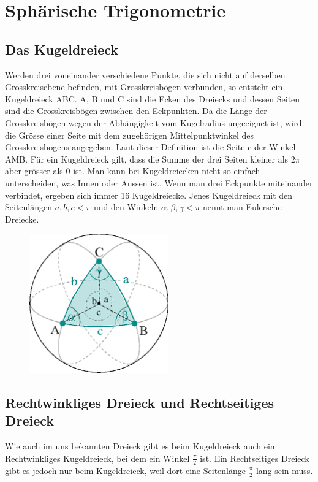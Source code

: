 \documentclass[12pt]{scrartcl}
\begin{document}
	\section{Sphärische Trigonometrie}
	\subsection{Das Kugeldreieck}
	
Werden drei voneinander verschiedene Punkte, die sich nicht auf derselben Grosskreisebene befinden, mit Grosskreisbögen verbunden, so entsteht ein Kugeldreieck ABC.
A, B und C sind die Ecken des Dreiecks und dessen Seiten sind die Grosskreisbögen zwischen den Eckpunkten. 
Da die Länge der Grosskreisbögen wegen der Abhängigkeit vom Kugelradius ungeeignet ist, wird die Grösse einer Seite mit dem zugehörigen Mittelpunktwinkel des Grosskreisbogens angegeben. 
Laut dieser Definition ist die Seite c der Winkel AMB. 
Für ein Kugeldreieck gilt, dass die Summe der drei Seiten kleiner als $2\pi$ aber grösser als 0 ist. 
Man kann bei Kugeldreiecken nicht so einfach unterscheiden, was Innen oder Aussen ist. 
Wenn man drei Eckpunkte miteinander verbindet, ergeben sich immer 16 Kugeldreiecke. 
Jenes Kugeldreieck mit den Seitenlängen $a, b, c < \pi$ und den Winkeln $\alpha, \beta, \gamma < \pi$ nennt man Eulersche Dreiecke.
\begin{figure}[h]
	\begin{center}
		\includegraphics[width=6cm]{Bilder/kugel1.png}
	\end{center}
	
\end{figure}

\subsection{Rechtwinkliges Dreieck und Rechtseitiges Dreieck}
Wie auch im uns bekannten Dreieck gibt es beim Kugeldreieck auch ein Rechtwinkliges Kugeldreieck, bei dem ein Winkel $\frac{\pi}{2}$ ist. 
Ein Rechtseitiges Dreieck gibt es jedoch nur beim Kugeldreieck, weil dort eine Seitenlänge $\frac{\pi}{2}$ lang sein muss.
	\newpage
\end{document}
